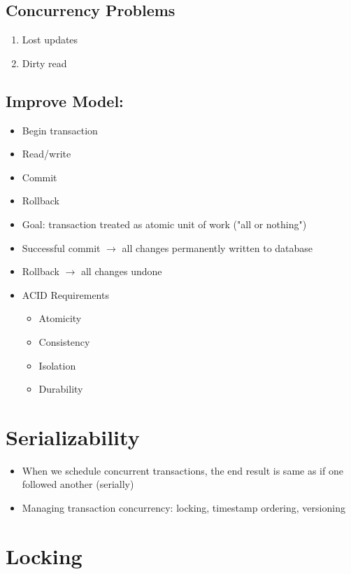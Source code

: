 \documentclass[12pt]{article}
\begin{document}
		\subsection*{Concurrency Problems}
		\begin{enumerate}
			\item
				Lost updates
			\item
				Dirty read
		\end{enumerate}
		\subsection*{Improve Model:}
			\begin{itemize}
				\item
					Begin transaction
				\item
					Read/write
				\item
					Commit
				\item
					Rollback
				\item
					Goal: transaction treated as atomic unit of work ("all or nothing")
				\item
					Successful commit $\rightarrow$ all changes permanently written to database
				\item
					Rollback $\rightarrow$ all changes undone
				\item
					ACID Requirements
					\begin{itemize}
						\item
							Atomicity
						\item
							Consistency
						\item
							Isolation
						\item
							Durability
					\end{itemize}
			\end{itemize}
	\section*{Serializability}
		
		\begin{itemize}
			\item
				When we schedule concurrent transactions, the end result is same as if one followed another (serially)
			\item
				Managing transaction concurrency: locking, timestamp ordering, versioning
		\end{itemize}
		\section*{Locking}
\end{document}
